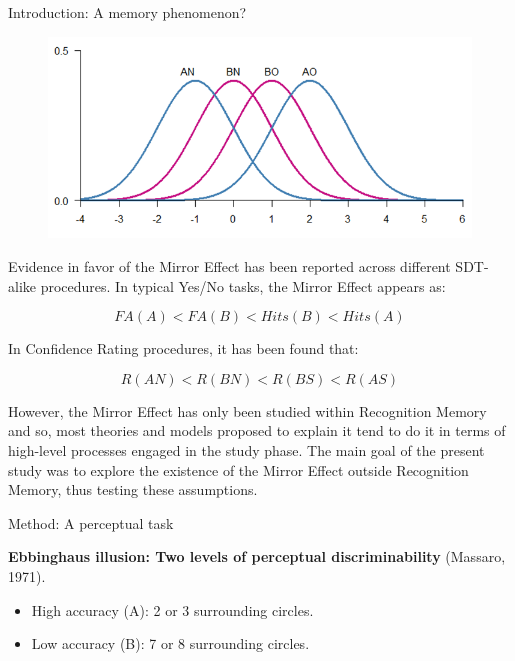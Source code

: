 \documentclass[final]{beamer}
\newlength{\onecolwid}
\begin{document}
\begin{frame}[t]
\begin{columns}[t]
\begin{column}{\onecolwid}
\begin{alertblock}{Introduction: A memory phenomenon?}
\begin{figure}
\includegraphics[width=0.5\linewidth]{Figures/MirrorEffect.png}
\end{figure}

Evidence in favor of the Mirror Effect has been reported across different SDT-alike procedures. In typical Yes/No tasks, the Mirror Effect appears as:

\begin{equation}
FA(A) < FA(B) < Hits(B) < Hits(A)
\label{eqn:Rates}
\end{equation}

In Confidence Rating procedures, it has been found that:

\begin{equation}
R(AN) < R(BN) < R(BS) < R(AS)
\label{eqn:Confidence}
\end{equation}

However, the Mirror Effect has only been studied within Recognition Memory and so, most theories and models proposed to explain it tend to do it in terms of high-level processes engaged in the study phase. The main goal of the present study was to explore the existence of the Mirror Effect outside Recognition Memory, thus testing these assumptions. 
\end{alertblock}



\begin{alertblock}{Method: A perceptual task}

\textbf{Ebbinghaus illusion: Two levels of perceptual discriminability} (Massaro, 1971).

\begin{itemize}
\item High accuracy (A): 2 or 3 surrounding circles.
\item Low accuracy (B): 7 or 8 surrounding circles.
\end{itemize}


\end{alertblock}
\end{column}
\end{columns}
\end{frame}
\end{document}
